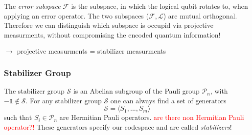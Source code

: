 The \textit{error subspace} $\mathcal{F}$ is the subspace, in which the logical qubit rotates to, when applying an error operator. 
The two subspaces ($\mathcal{F} , \mathcal{L}$) are mutual orthogonal. 
Therefore we can distinguish which subspace is occupid via projective measurments, 
without compromising the encoded quantum information!  \cite{QECintro}

$\rightarrow$ projective measurments = stabilizer measurments



\subsubsection{Stabilizer Group}
The stabilizer group $\mathcal{S}$ is an Abelian subgroup of the Pauli group $\mathcal{P}_n$, with $-\mathds{1} \notin \mathcal{S}$.
For any stabilizer group $\mathcal{S}$ one can always find a set of generators
\begin{equation}
    \mathcal{S} = \langle S_1, ..., S_m \rangle
\end{equation}
such that $S_i\in \mathcal{P}_n$ are Hermitian Pauli operators. \textcolor{red}{are there non Hermitian Pauli operator?!} 
These generators specify our codespace and are called \textit{stabilizers}! \cite{QECmemory}


